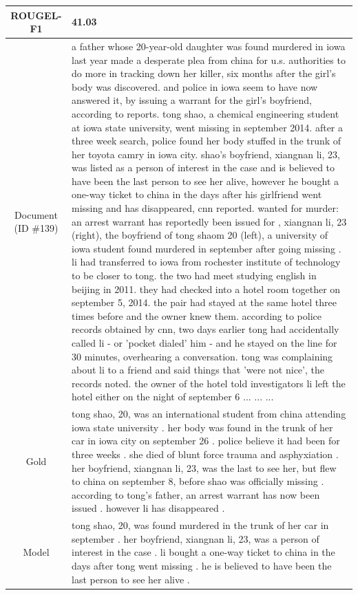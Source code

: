 \begin{table}[bth!]
\begin{tabular}{c|p{}}
\\ \hline
ROUGEL-F1 & 
41.03
\\ \hline
\makecell{Document\\(ID \#139)} & 
a father whose 20-year-old daughter was found murdered in iowa last year made a desperate plea from china for u.s. authorities to do more in tracking down her killer, six months after the girl's body was discovered. and police in iowa seem to have now answered it, by issuing a warrant for the girl's boyfriend, according to reports. tong shao, a chemical engineering student at iowa state university, went missing in september 2014. after a three week search, police found her body stuffed in the trunk of her toyota camry in iowa city. shao's boyfriend, xiangnan li, 23, was listed as a person of interest in the case and is believed to have been the last person to see her alive, however he bought a one-way ticket to china in the days after his girlfriend went missing and has disappeared, cnn reported. wanted for murder: an arrest warrant has reportedly been issued for , xiangnan li, 23 (right), the boyfriend of tong shaom 20 (left), a university of iowa student found murdered in september after going missing . li had transferred to iowa from rochester institute of technology to be closer to tong. the two had meet studying english in beijing in 2011. they had checked into a hotel room together on september 5, 2014. the pair had stayed at the same hotel three times before and the owner knew them. according to police records obtained by cnn, two days earlier tong had accidentally called li - or 'pocket dialed' him - and he stayed on the line for 30 minutes, overhearing a conversation. tong was complaining about li to a friend and said things that 'were not nice', the records noted. the owner of the hotel told investigators li left the hotel either on the night of september 6 ... ... ... 
\\ \hline
Gold & 
tong shao, 20, was an international student from china attending iowa state university . her body was found in the trunk of her car in iowa city on september 26 . police believe it had been for three weeks . she died of blunt force trauma and asphyxiation . her boyfriend, xiangnan li, 23, was the last to see her, but flew to china on september 8, before shao was officially missing . according to tong's father, an arrest warrant has now been issued . however li has disappeared .
\\ \hline
Model & 
tong shao, 20, was found murdered in the trunk of her car in september . her boyfriend, xiangnan li, 23, was a person of interest in the case . li bought a one-way ticket to china in the days after tong went missing . he is believed to have been the last person to see her alive .

\end{tabular}
\end{table}
